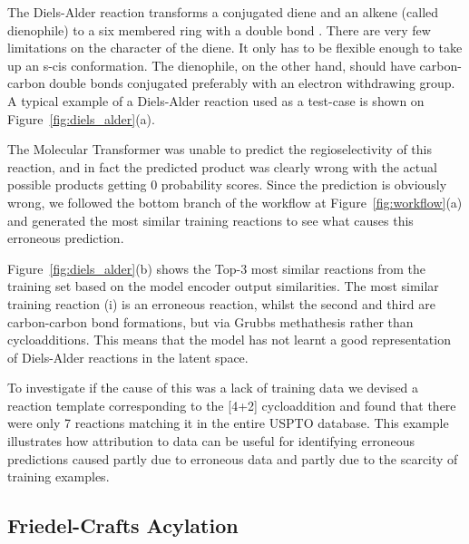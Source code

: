 The Diels-Alder reaction transforms a conjugated diene and an alkene (called dienophile) to a six membered ring with a double bond \cite{Clayden2012}. There are very few limitations on the character of the diene. It only has to be flexible enough to take up an s-cis conformation. The dienophile, on the other hand, should have carbon-carbon double bonds conjugated preferably with an electron withdrawing group. A typical example of a Diels-Alder reaction used as a test-case is shown on Figure~\ref{fig:diels_alder}(a). 

The Molecular Transformer was unable to predict the regioselectivity of this reaction, and in fact the predicted product was clearly wrong with the actual possible products getting 0 probability scores. Since the prediction is obviously wrong, we followed the bottom branch of the workflow at Figure~\ref{fig:workflow}(a) and generated the most similar training reactions to see what causes this erroneous prediction.

Figure~\ref{fig:diels_alder}(b) shows the Top-3 most similar reactions from the training set based on the model encoder output similarities. The most similar training reaction (i) is an erroneous reaction, whilst the second and third are carbon-carbon bond formations, but via Grubbs methathesis \cite{grubbs} rather than cycloadditions. This means that the model has not learnt a good representation of Diels-Alder reactions in the latent space. 

To investigate if the cause of this was a lack of training data we devised a reaction template corresponding to the [4+2] cycloaddition and found that there were only 7 reactions matching it in the entire USPTO database. This example illustrates how attribution to data can be useful for identifying erroneous predictions caused partly due to erroneous data and partly due to the scarcity of training examples. 

\subsection{Friedel-Crafts Acylation}

